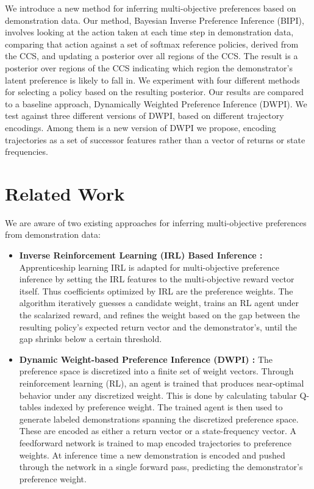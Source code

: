 \documentclass[11pt]{article}
\begin{document}
We introduce a new method for inferring multi-objective preferences based on demonstration data. Our method, Bayesian Inverse Preference Inference (BIPI), involves looking at the action taken at each time step in demonstration data, comparing that action against a set of softmax reference policies, derived from the CCS, and updating a posterior over all regions of the CCS. The result is a posterior over regions of the CCS indicating which region the demonstrator's latent preference is likely to fall in. We experiment with four different methods for selecting a policy based on the resulting posterior. Our results are compared to a baseline approach, Dynamically Weighted Preference Inference (DWPI). We test against three different versions of DWPI, based on different trajectory encodings. Among them is a new version of DWPI we propose, encoding trajectories as a set of successor features rather than a vector of returns or state frequencies.

\section{Related Work}

We are aware of two existing approaches for inferring multi-objective preferences from demonstration data:

\begin{itemize}
    \item \textbf{Inverse Reinforcement Learning (IRL) Based Inference \cite{ikenaga2018, takayama2022}:} Apprenticeship learning IRL is adapted for multi-objective preference inference by setting the IRL features to the multi-objective reward vector itself. Thus coefficients optimized by IRL are the preference weights. The algorithm iteratively guesses a candidate weight, trains an RL agent under the scalarized reward, and refines the weight based on the gap between the resulting policy's expected return vector and the demonstrator's, until the gap shrinks below a certain threshold.

    \item \textbf{Dynamic Weight-based Preference Inference (DWPI) \cite{lu2023}:} The preference space is discretized into a finite set of weight vectors. Through reinforcement learning (RL), an agent is trained that produces near-optimal behavior under any discretized weight. This is done by calculating tabular Q-tables indexed by preference weight. The trained agent is then used to generate labeled demonstrations spanning the discretized preference space. These are encoded as either a return vector or a state-frequency vector. A feedforward network is trained to map encoded trajectories to preference weights. At inference time a new demonstration is encoded and pushed through the network in a single forward pass, predicting the demonstrator's preference weight.
\end{itemize}
\end{document}
